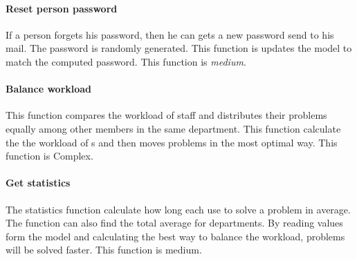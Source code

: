 \paragraph{Reset person password}
If a person forgets his password, then he can gets a new password send to his mail. The password is randomly generated. This function is updates the model to match the computed password. This function is \textit{medium}.

\paragraph{Balance workload}
This function compares the workload of staff and distributes their problems equally among other \astaff members in the same department. This function calculate the the workload of \astaff s and then moves problems in the most optimal way. This function is Complex.   

\paragraph{Get statistics}
The statistics function calculate how long each \astaff[] use to solve a problem in average. The function can also find the total average for departments. By reading values form the model and calculating the best way to balance the workload, problems will be solved faster. This function is medium.










